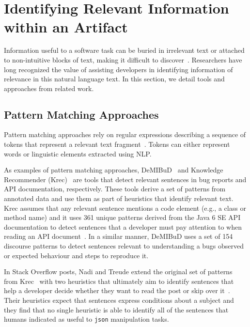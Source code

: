 \section{Identifying Relevant Information within an Artifact}
\label{cp2:artifact-approaches}



Information useful to a software task can be buried in irrelevant text or attached to 
non-intuitive blocks of text, making it difficult to discover~\cite{Robillard2015}.
Researchers have long recognized the value of assisting developers in 
identifying information of relevance in this natural language
text.
In this section, we detail tools and approaches from related work.




\subsection{Pattern Matching Approaches}


Pattern matching approaches rely on regular expressions describing a sequence of tokens that represent a relevant text fragment~\cite{Bavota2016}. Tokens can either represent words or linguistic elements 
extracted using \acf{NLP}.
    
    
As examples  of pattern matching approaches,  {\small DeMIBuD}~\cite{Chaparro2017} and Knowledge Recommender (Krec)~\cite{Maalej2013, Robillard2015} are tools that detect relevant sentences in bug reports and API documentation, respectively. 
These tools derive a set of patterns from annotated data and use them as part of heuristics 
that identify relevant text. Krec assumes that any relevant sentence mentions a 
code element (e.g., a class or method name) and it uses  361 unique patterns derived from the Java 6 SE API documentation to 
detect sentences that a developer must pay attention to when reading an API document~\cite{Robillard2015}.
In a similar manner, {\small DeMIBuD} uses a set of 154 discourse patterns to detect sentences 
relevant to understanding a bugs observed or expected behaviour and steps to reproduce it.





In  Stack Overflow posts, Nadi and Treude  extend the original set of patterns from Krec~\cite{Robillard2015} with two heuristics that ultimately aim to identify sentences that help a developer decide whether they want to read the post or skip over it~\cite{nadi2020}. 
Their heuristics expect that sentences express conditions about a subject and 
they find that no single heuristic is able to identify all of the sentences 
that humans indicated as useful to \texttt{json} manipulation tasks. 







